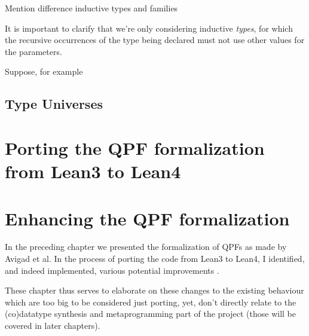 \documentclass[titlepage]{report}
\newenvironment{remark}[1][Remark:]{\begin{trivlist}                         
    \item[\hskip \labelsep {\bfseries #1}]}{\end{trivlist}}
\newenvironment{todo}[1][Todo:]{\begin{trivlist}                         
    \item[\hskip \labelsep {\bfseries #1}]}{\end{trivlist}}
\begin{document}
\begin{remark}
    
\end{remark}











\begin{todo}
    Mention difference inductive types and families

    It is important to clarify that we're only considering inductive \emph{types}, 
for which the recursive occurrences of the type being declared must not use other values for the 
parameters.

Suppose, for example 
\end{todo}








\section{Type Universes}
\label{sec:bg:universes}





\chapter{Porting the QPF formalization from Lean3 to Lean4}
\label{ch:porting}








\chapter{Enhancing the QPF formalization}
\label{ch:enhancing}


In the preceding chapter we presented the formalization of QPFs as made by Avigad et al.
In the process of porting the code from Lean3 to Lean4, 
I identified, and indeed implemented, various potential improvements . 

These chapter thus serves to elaborate on these changes to the existing behaviour which are too big
to be considered just porting, yet, don't directly relate to the (co)datatype synthesis and metaprogramming
part of the project (those will be covered in later chapters).
\end{document}
